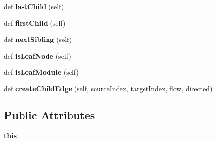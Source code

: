 \begin{DoxyCompactItemize}
\item 
\mbox{\label{classinfomapfolder_1_1infomap_1_1ChildIterator_a9cf80485971bcbb0ef471ec90f455f25}} 
def {\bfseries last\+Child} (self)
\item 
\mbox{\label{classinfomapfolder_1_1infomap_1_1ChildIterator_a929b6774b0dc8662b21148035f66c2b8}} 
def {\bfseries first\+Child} (self)
\item 
\mbox{\label{classinfomapfolder_1_1infomap_1_1ChildIterator_a505085081e75afefa709693eba81dd0e}} 
def {\bfseries next\+Sibling} (self)
\item 
\mbox{\label{classinfomapfolder_1_1infomap_1_1ChildIterator_a54e9994919f8508036fc2b3fe9bcb5e1}} 
def {\bfseries is\+Leaf\+Node} (self)
\item 
\mbox{\label{classinfomapfolder_1_1infomap_1_1ChildIterator_a425c243a471e80f47562748877d184ea}} 
def {\bfseries is\+Leaf\+Module} (self)
\item 
\mbox{\label{classinfomapfolder_1_1infomap_1_1ChildIterator_a147fd3f5ffb9dc9cfc5827fbbc4ec4fb}} 
def {\bfseries create\+Child\+Edge} (self, source\+Index, target\+Index, flow, directed)
\end{DoxyCompactItemize}
\subsection*{Public Attributes}
\begin{DoxyCompactItemize}
\item 
\mbox{\label{classinfomapfolder_1_1infomap_1_1ChildIterator_aa8d2264b688f1b1d307f6e5daaa26bf8}} 
{\bfseries this}
\end{DoxyCompactItemize}

